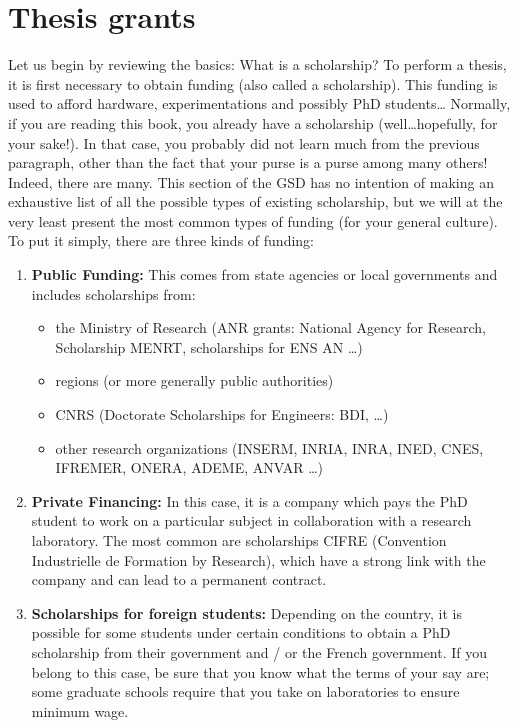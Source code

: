 \section{Thesis grants}
Let us begin by reviewing the basics: What is a scholarship?
To perform a thesis, it is first necessary to obtain funding (also called a scholarship).
This funding is used to afford hardware, experimentations and possibly PhD students\dots
{}
Normally, if you are reading this book, you already have a scholarship (well\dots hopefully, for your sake!).
In that case, you probably did not learn much from the previous paragraph, other than the fact that your purse is a purse among many others!
Indeed, there are many.
This section of the GSD has no intention of making an exhaustive list of all the possible types of existing scholarship, but we will at the very least present the most common types of funding (for your general culture).
To put it simply, there are three kinds of funding:
\begin{enumerate}
  \item \textbf{Public Funding:} This comes from state agencies or local governments and includes scholarships from:
  \begin{itemize}
    \item the Ministry of Research (ANR grants: National Agency for Research, Scholarship MENRT, scholarships for ENS AN \dots)
    \item regions (or more generally public authorities)
    \item CNRS (Doctorate Scholarships for Engineers: BDI, \dots)
    \item other research organizations (INSERM, INRIA, INRA, INED, CNES, IFREMER, ONERA, ADEME, ANVAR \dots)
  \end{itemize}
  \item \textbf{Private Financing:} In this case, it is a company which pays the PhD student to work on a particular subject in collaboration with a research laboratory. The most common are scholarships CIFRE (Convention Industrielle de Formation by Research), which have a strong link with the company and can lead to a permanent contract.  
  \item \textbf{Scholarships for foreign students:} Depending on the country, it is possible for some students under certain conditions to obtain a PhD scholarship from their government and / or the French government. If you belong to this case, be sure that you know what the terms of your say are; some  graduate schools require that you take on laboratories to ensure minimum wage.
\end{enumerate}

